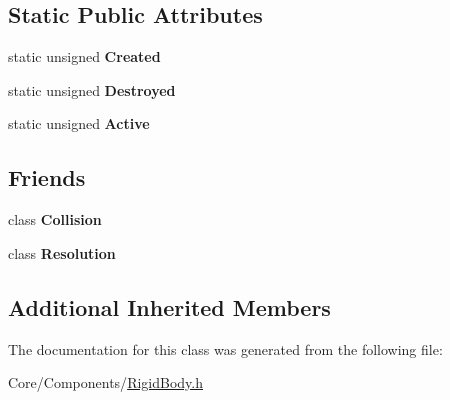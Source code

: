 \subsection*{Static Public Attributes}
\begin{DoxyCompactItemize}
\item 
\hypertarget{classDCEngine_1_1Components_1_1RigidBody_a1ab532f18e2fa3dc03aa76168e8af62c}{static unsigned {\bfseries Created}}\label{classDCEngine_1_1Components_1_1RigidBody_a1ab532f18e2fa3dc03aa76168e8af62c}

\item 
\hypertarget{classDCEngine_1_1Components_1_1RigidBody_a5a12eae8f928d54607ae830966e6f4f0}{static unsigned {\bfseries Destroyed}}\label{classDCEngine_1_1Components_1_1RigidBody_a5a12eae8f928d54607ae830966e6f4f0}

\item 
\hypertarget{classDCEngine_1_1Components_1_1RigidBody_ab09685f63c7904e6f08d714dba96bbf8}{static unsigned {\bfseries Active}}\label{classDCEngine_1_1Components_1_1RigidBody_ab09685f63c7904e6f08d714dba96bbf8}

\end{DoxyCompactItemize}
\subsection*{Friends}
\begin{DoxyCompactItemize}
\item 
\hypertarget{classDCEngine_1_1Components_1_1RigidBody_aa08e39e5a8a0a97f10c15f0c5d98013b}{class {\bfseries Collision}}\label{classDCEngine_1_1Components_1_1RigidBody_aa08e39e5a8a0a97f10c15f0c5d98013b}

\item 
\hypertarget{classDCEngine_1_1Components_1_1RigidBody_a29bcc411593bce42afc9222fc174d7f9}{class {\bfseries Resolution}}\label{classDCEngine_1_1Components_1_1RigidBody_a29bcc411593bce42afc9222fc174d7f9}

\end{DoxyCompactItemize}
\subsection*{Additional Inherited Members}


The documentation for this class was generated from the following file\-:\begin{DoxyCompactItemize}
\item 
Core/\-Components/\hyperlink{RigidBody_8h}{Rigid\-Body.\-h}\end{DoxyCompactItemize}
